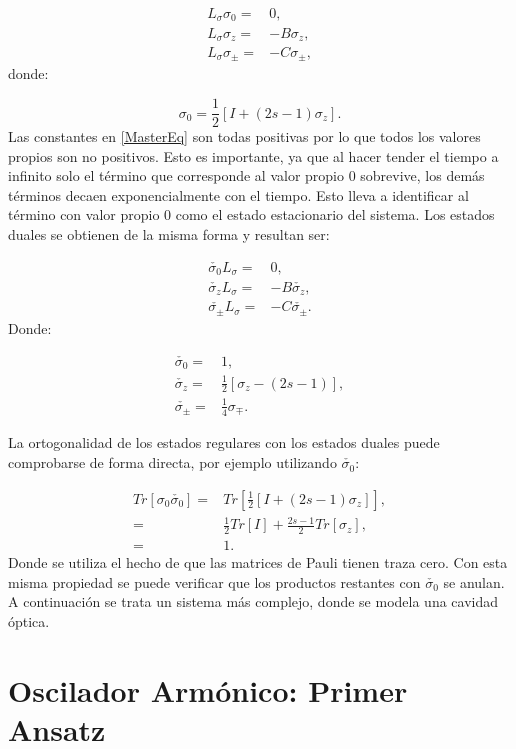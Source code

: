 \documentclass[a4paper,10pt]{report}
\begin{document}
\begin{align}
L_\sigma \sigma_0 =& 0, \\
L_\sigma \sigma_z =& -B \sigma_z, \\
L_\sigma \sigma_\pm =& -C \sigma_\pm,
\end{align} donde:

\begin{equation}
\sigma_0 = \frac{1}{2}[I + (2s-1)\sigma_z].
\end{equation} Las constantes en \eqref{MasterEq} son todas positivas por lo que todos los valores propios son no positivos. Esto es importante, ya que al hacer tender el tiempo a infinito solo el término que corresponde al valor propio 0 sobrevive, los demás términos decaen exponencialmente con el tiempo. Esto lleva a identificar al término con valor propio 0 como el estado estacionario del sistema. Los estados duales se obtienen de la misma forma y resultan ser\cite{EnglertDB}:

\begin{align}
\check{\sigma_0} L_\sigma  =& 0, \\
\check{\sigma_z} L_\sigma =& -B \check{\sigma_z}, \\
\check{\sigma_{\pm}} L_\sigma =& -C \check{\sigma_{\pm}}.
\end{align} Donde:

\begin{align*}
\check{\sigma_0} =& 1,\\
\check{\sigma_z} =& \frac{1}{2}[\sigma_z-(2s-1)],\\
\check{\sigma_{\pm}} =& \frac{1}{4}\sigma_{\mp}.
\end{align*}

La ortogonalidad de los estados regulares con los estados duales puede comprobarse de forma directa, por ejemplo utilizando $\check{\sigma_0}$:

\begin{align*}
Tr[\sigma_0\check{\sigma_0}] =& Tr[\frac{1}{2}[I + (2s-1)\sigma_z]],\\
=& \frac{1}{2} Tr[I] + \frac{2s-1}{2}Tr[\sigma_z],\\
=& 1.
\end{align*} Donde se utiliza el hecho de que las matrices de Pauli tienen traza cero. Con esta misma propiedad se puede verificar que los productos restantes con $\check{\sigma_0}$ se anulan. A continuación se trata un sistema más complejo, donde se modela una cavidad óptica.

\section{Oscilador Armónico: Primer Ansatz}
\end{document}
